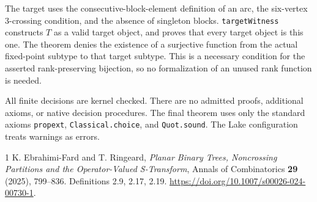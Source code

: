 \documentclass[11pt]{article}
\begin{document}
The target uses the consecutive-block-element definition of an arc,
the six-vertex 3-crossing condition, and the absence of singleton blocks.
\texttt{targetWitness} constructs $T$ as a valid target object, and
 proves that every target object is this one.
The theorem  denies the existence of a
surjective function from the actual fixed-point subtype to that target
subtype. This is a necessary condition for the asserted rank-preserving
bijection, so no formalization of an unused rank function is needed.

All finite decisions are kernel checked. There are no admitted proofs,
additional axioms, or native decision procedures. The final theorem
uses only the standard axioms \texttt{propext}, \texttt{Classical.choice},
and \texttt{Quot.sound}. The Lake configuration treats warnings as errors.

\begin{thebibliography}{1}
K. Ebrahimi-Fard and T. Ringeard,
\emph{Planar Binary Trees, Noncrossing Partitions and the Operator-Valued
S-Transform}, Annals of Combinatorics \textbf{29} (2025), 799--836.
Definitions 2.9, 2.17, 2.19.
\url{https://doi.org/10.1007/s00026-024-00730-1}.
\end{thebibliography}
\end{document}
